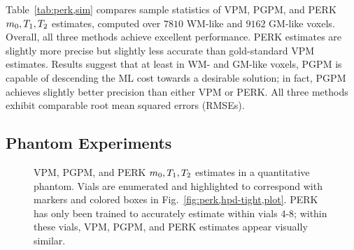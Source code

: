Table~\ref{tab:perk,sim} compares sample statistics
of VPM, PGPM, and PERK $m_0,T_1,T_2$ estimates,
computed over $7810$ WM-like and $9162$ GM-like voxels.
Overall,
all three methods achieve excellent performance.
PERK estimates are slightly more precise 
but slightly less accurate 
than gold-standard VPM estimates. 
Results suggest that 
at least in WM- and GM-like voxels,
PGPM is capable of descending the ML cost 
towards a desirable solution;
in fact, PGPM achieves slightly better precision
than either VPM or PERK.
All three methods exhibit comparable 
root mean squared errors (RMSEs).

\subsection{Phantom Experiments}
\label{ss,perk,exp,phant}

\begin{figure}[!t]
	\centering
	\begin{minipage}{\textwidth}
  	\hspace{0cm}
  	\hspace{0cm}
	\end{minipage}
	\caption{%
		VPM, PGPM, and PERK $m_0,T_1,T_2$ estimates 
		in a quantitative phantom.
		Vials are enumerated and highlighted
		to correspond with markers and colored boxes
		in Fig.~\ref{fig:perk,hpd-tight,plot}.
		PERK has only been trained 
		to accurately estimate within vials 4-8;
		within these vials,
		VPM, PGPM, and PERK estimates 
		appear visually similar.
	}
	\label{fig:perk,hpd-tight}
\end{figure}

